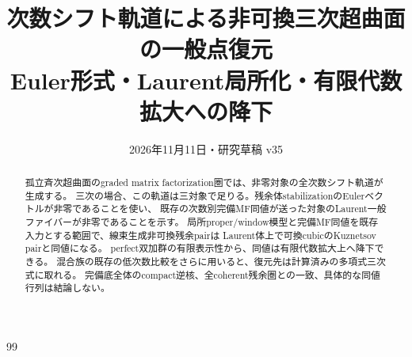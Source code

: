 \documentclass[a4paper,11pt]{ltjsarticle}
\title{次数シフト軌道による非可換三次超曲面の一般点復元\\
\large Euler形式・Laurent局所化・有限代数拡大への降下}
\author{}\date{2026年11月11日・研究草稿 v35}
\theoremstyle{remark}\newtheorem{remark}[theorem]{注意}
\begin{document}
\maketitle
\begin{abstract}
孤立斉次超曲面のgraded matrix factorization圏では、非零対象の全次数シフト軌道が生成する。
三次の場合、この軌道は三対象で足りる。残余体stabilizationのEulerベクトルが非零であることを使い、
既存の次数別完備MF同値が送った対象のLaurent一般ファイバーが非零であることを示す。
局所proper/window模型と完備MF同値を既存入力とする範囲で、線束生成非可換残余pairは
Laurent体上で可換cubicのKuznetsov pairと同値になる。
perfect双加群の有限表示性から、同値は有限代数拡大上へ降下できる。
混合族の既存の低次数比較をさらに用いると、復元先は計算済みの多項式三次式に取れる。
完備底全体のcompact逆核、全coherent残余圏との一致、具体的な同値行列は結論しない。
\end{abstract}
\tableofcontents

\begin{thebibliography}{99}

\end{thebibliography}
\end{document}

